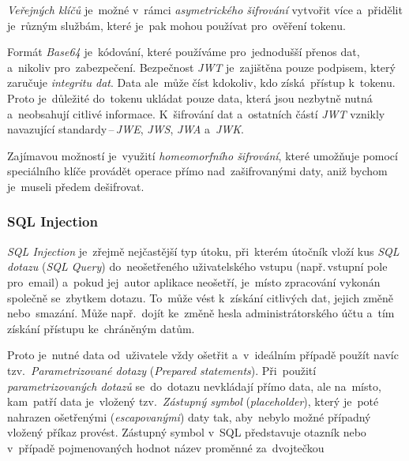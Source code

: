 \documentclass[10pt,a4paper]{article}
\begin{document}
                \emph{Veřejných klíčů} je~možné v~rámci \emph{asymetrického šifrování} vytvořit více a~přidělit je~různým službám, které je~pak mohou používat pro~ověření tokenu.

                Formát \emph{Base64} je~kódování, které používáme pro~jednodušší přenos dat, a~nikoliv pro~zabezpečení. Bezpečnost \emph{JWT} je~zajištěna pouze podpisem, který zaručuje \emph{integritu dat}. Data ale~může číst kdokoliv, kdo získá~přístup k~tokenu. Proto je~důležité do~tokenu ukládat pouze data, která jsou nezbytně nutná a~neobsahují citlivé informace. K~šifrování dat a~ostatních částí \emph{JWT} vznikly navazující standardy\,--\,\emph{JWE}, \emph{JWS}, \emph{JWA} a~\emph{JWK}. \cite{jwtesak}

                Zajímavou možností je~využití \emph{homeomorfního šifrování}, které umožňuje pomocí speciálního klíče provádět operace přímo nad~zašifrovanými daty, aniž bychom je~museli předem dešifrovat. \cite{graham2021ethical}

            \subsubsection{SQL Injection}
                \emph{SQL Injection} je~zřejmě nejčastější typ útoku, při~kterém útočník vloží kus \emph{SQL dotazu} (\emph{SQL Query}) do~neošetřeného uživatelského vstupu (např.\,vstupní pole pro~email) a~pokud jej~autor aplikace neošetří, je~místo zpracování vykonán společně se~zbytkem dotazu. To~může vést k~získání citlivých dat, jejich změně nebo~smazání. Může např.~dojít ke~změně hesla administrátorského účtu a~tím získání přístupu ke~chráněným datům.

                Proto je~nutné data od~uživatele vždy ošetřit a~v~ideálním případě použít navíc tzv.~\emph{Parametrizované dotazy} (\emph{Prepared statements}). Při~použití \emph{parametrizovaných dotazů} se~do~dotazu nevkládají přímo data, ale na~místo, kam~patří data je~vložený tzv.~\emph{Zástupný symbol} (\emph{placeholder}), který je~poté nahrazen ošetřenými (\emph{escapovanými}) daty tak, aby~nebylo možné případný vložený příkaz provést. Zástupný symbol v~SQL představuje otazník  nebo v~případě pojmenovaných hodnot název proměnné za~dvojtečkou  \cite{graham2021ethical}
                
\end{document}
